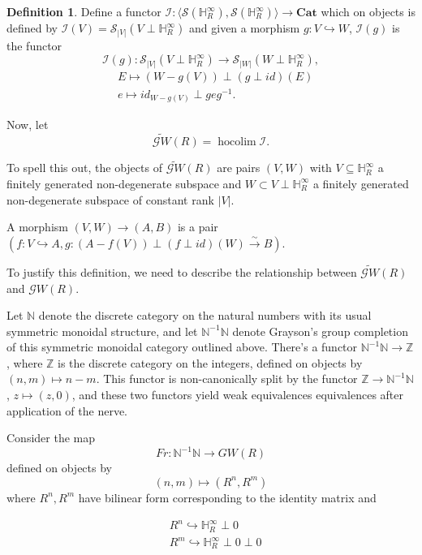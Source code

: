 \documentclass[edeposit,fullpage]{uiucthesis2009}
\newcommand{\Z}{\mathbb Z}
\newcommand{\mbb}{\mathbb}
\newcommand{\mc}{\mathcal}
\newcommand{\Cat}{\mathbf{Cat}}
\DeclareMathOperator*{\hocolim}{hocolim}
\theoremstyle{plain}
\numberwithin{lemma}{section}
\theoremstyle{definition}
\newtheorem{definition}[lemma]{Definition}
\begin{document}
\begin{definition}
Define a functor $\mc I : \langle
\mc S(\mbb H_R^\infty), \mc S(\mbb H_R^\infty) \rangle \rightarrow
\Cat$ which on objects is defined by $\mc I(V) = \mc S_{|V|}(V \perp
\mbb H_R^\infty)$ and given a morphism $g : V
\hookrightarrow W$, $\mc I(g)$ is the functor
\[
\mc I(g) : \mc S_{|V|}(V \perp
\mbb H_R^\infty) \rightarrow \mc S_{|W|}(W \perp
\mbb H_R^\infty),
\]
\begin{align*}
&E \mapsto (W - g(V)) \perp (g\perp id)(E)\\
&e \mapsto id_{W-g(V)} \perp geg^{-1}.
\end{align*}

Now, let 
\[
\widetilde{\mathscr GW}(R) = \hocolim \mc I.
\]

To spell this out, the objects of $\widetilde{\mathscr GW}(R)$ are pairs $(V,W)$ with $V
\subseteq \mbb H^\infty_R$ a finitely generated non-degenerate
subspace and $W \subset V \perp \mbb H^\infty_R$ a finitely generated
non-degenerate subspace of constant rank $|V|$.

A morphism $(V,W) \rightarrow (A,B)$ is a pair $(f : V \hookrightarrow
A,
g  : (A-f(V))\perp (f\perp id)(W) \xrightarrow{\sim} B)$.
\end{definition}

To justify this definition, we need to describe the relationship
between $\widetilde{\mathscr GW}(R)$ and $\mathscr GW(R)$.

Let $\mbb N$ denote the discrete category on the natural numbers with
its usual symmetric monoidal structure, and
let $\mbb N^{-1}\mbb N$ denote Grayson's group completion of this
symmetric monoidal category outlined above. There's a functor $\mbb
N^{-1}\mbb N \rightarrow \Z$, where $\Z$ is the discrete category on
the integers, defined on objects by $(n,m) \mapsto n-m$. This functor
is non-canonically split by the functor $\Z \rightarrow \mbb
N^{-1}\mbb N$, $z \mapsto (z,0)$, and these two functors yield weak equivalences
equivalences after application of the nerve. 

Consider the map 
\[
Fr: \mbb N^{-1}\mbb N  \rightarrow GW(R)
\]
defined on objects by
\[
(n,m) \mapsto (R^n,R^m)
\]
where $R^n,R^m$ have bilinear form corresponding to the identity
matrix and 

\begin{align*}
&R^n
\hookrightarrow \mbb H^\infty_R \perp 0\\ 
&R^m \hookrightarrow \mbb H^\infty_R \perp 0
\perp 0
\end{align*}
\end{document}
